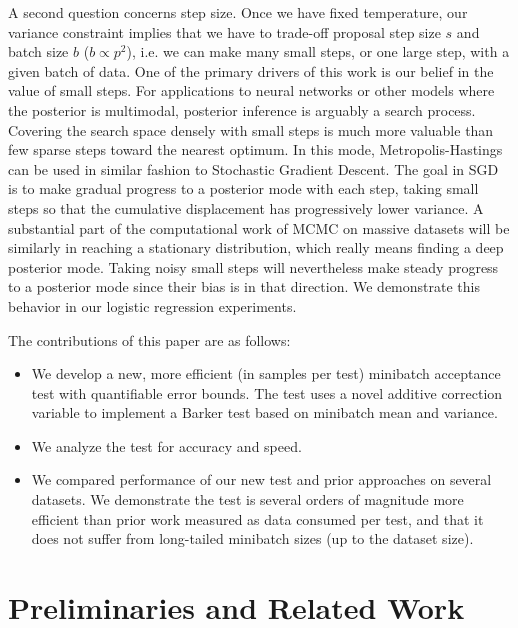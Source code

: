 \documentclass{article}
\begin{document}
A second question concerns step size. Once we have fixed temperature,
our variance constraint implies that we have to trade-off proposal
step size $s$ and batch size $b$ ($b \propto p^2$), i.e. we can make
many small steps, or one large step, with a given batch of data. One
of the primary drivers of this work is our belief in the value of
small steps. For applications to neural networks or other models where
the posterior is multimodal, posterior inference is arguably a search
process. Covering the search space densely with small steps is much
more valuable than few sparse steps toward the nearest optimum. In
this mode, Metropolis-Hastings can be used in similar fashion to
Stochastic Gradient Descent. The goal in SGD is to make gradual
progress to a posterior mode with each step, taking small steps so
that the cumulative displacement has progressively lower variance. A
substantial part of the computational work of MCMC on massive datasets
will be similarly in reaching a stationary distribution, which really
means finding a deep posterior mode. Taking noisy small steps will
nevertheless make steady progress to a posterior mode since their bias
is in that direction. We demonstrate this behavior in our logistic regression
experiments.

The contributions of this paper are as follows:

\begin{itemize}
\item We develop a new, more efficient (in samples per test) minibatch acceptance test with quantifiable error bounds. The test
  uses a novel additive correction variable to implement a Barker test based on minibatch mean and variance. 
\item We analyze the test for accuracy and speed.
\item We compared performance of our new test and prior approaches on several datasets. We demonstrate the test is several orders
  of magnitude more efficient than prior work measured as data consumed per test, and that it does not suffer
  from long-tailed minibatch sizes (up to the dataset size). 
\end{itemize}




\section{Preliminaries and Related Work}\label{sec:related_work}
\end{document}
